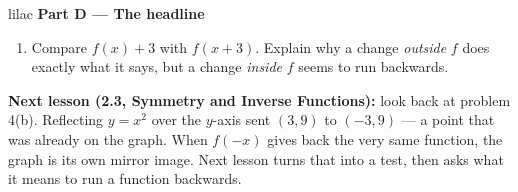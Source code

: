 \documentclass[10pt]{article}
\begin{document}
\vspace{0.06in}

\begin{headlinebox}{lilac}
\textbf{\color{plum}Part D --- The headline}
\end{headlinebox}

\begin{enumerate}[leftmargin=1.9em, itemsep=10pt, start=10]

\item Compare $f(x) + 3$ with $f(x + 3)$. Explain why a change \emph{outside} $f$ does exactly
      what it says, but a change \emph{inside} $f$ seems to run backwards.
      \writespace{2.2cm}{}

\end{enumerate}

\vspace{0.1in}

\boxguard[8]
\begin{spiralbox}
\small
\textbf{Next lesson (2.3, Symmetry and Inverse Functions):} look back at problem 4(b).
Reflecting $y = x^2$ over the $y$-axis sent $(3, 9)$ to $(-3, 9)$ --- a point that was already
on the graph. When $f(-x)$ gives back the very same function, the graph is its own mirror
image. Next lesson turns that into a test, then asks what it means to run a function backwards.
\end{spiralbox}
\end{document}
